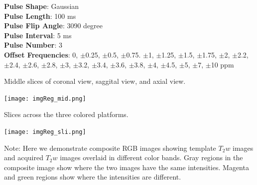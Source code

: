 \documentclass[12pt, letterpaper]{article}
\begin{document}
\vspace*{16pt}
\begin{tcolorbox}
[title = \textbf{Sequence Information - \textit{Anatomic}},
width=11.5cm,
height=8cm,
left skip=0cm]
\begin{multicols}{2}

\footnotesize{}

\columnbreak

\footnotesize{}

\end{multicols}
\end{tcolorbox}
\begin{tcolorbox}
[title = \textbf{CEST Saturation Parameters},
width=7.5cm,
height=8cm,
left skip=0.5cm]
\footnotesize{
\textbf{Pulse Shape}: Gaussian \\
\textbf{Pulse Length}: 100 ms \\
\textbf{Pulse Flip Angle}: 3090 degree \\
\textbf{Pulse Interval}: 5 ms \\
\textbf{Pulse Number}: 3 \\
\textbf{Offset Frequencies}: 0, $\pm$0.25, $\pm$0.5, $\pm$0.75. $\pm$1, $\pm$1.25, $\pm$1.5, $\pm$1.75, $\pm$2, $\pm$2.2, $\pm$2.4, $\pm$2.6, $\pm$2.8, $\pm$3, $\pm$3.2, $\pm$3.4, $\pm$3.6, $\pm$3.8, $\pm$4, $\pm$4.5, $\pm$5, $\pm$7, $\pm$10 ppm
}
\end{tcolorbox}

\vspace*{16pt}
\begin{tcolorbox}
[title = \textbf{Registration to Template - $T_2w$},
width=19.1cm,
left skip=0cm]
\begin{multicols}{2}
\footnotesize{Middle slices of coronal view, saggital view, and axial view.}

\smallskip
\texttt{[image: imgReg\_mid.png]} 

\columnbreak
\footnotesize{Slices across the three colored platforms.}

\smallskip
\texttt{[image: imgReg\_sli.png]}
\end{multicols}

\vspace*{-16pt}
\footnotesize{Note: Here we demonstrate composite RGB images showing template $T_2w$ images and acquired $T_2w$ images overlaid in different color bands. Gray regions in the composite image show where the two images have the same intensities. Magenta and green regions show where the intensities are different.}
\end{tcolorbox}
\end{document}
